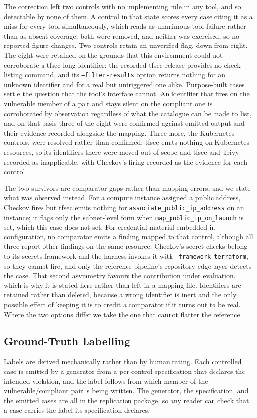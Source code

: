 \documentclass[smallextended]{svjour3}
\begin{document}
The correction left two controls with no implementing rule in any tool, and so
detectable by none of them. A control in that state scores every case citing it
as a miss for every tool simultaneously, which reads as unanimous tool failure
rather than as absent coverage; both were removed, and neither was exercised, so
no reported figure changes. Two controls retain an unverified flag, down from
eight. The eight were retained on the grounds that this environment could not
corroborate a tfsec long identifier: the recorded tfsec release provides no
check-listing command,
and its \texttt{--filter-results} option returns nothing for an unknown identifier
and for a real but untriggered one alike. Purpose-built cases settle the question
that the tool's interface cannot. An identifier that fires on the vulnerable member
of a pair and stays silent on the compliant one is corroborated by observation
regardless of what the catalogue can be made to list, and on that basis three of
the eight were confirmed against emitted output and their evidence recorded
alongside the mapping. Three more, the Kubernetes controls, were resolved rather
than confirmed: tfsec emits nothing on Kubernetes resources, so its identifiers
there were moved out of scope and tfsec and Trivy recorded as inapplicable, with
Checkov's firing recorded as the evidence for each control.

The two survivors are comparator gaps rather than mapping errors, and we state what
was observed instead. For a compute instance assigned a public address, Checkov
fires but tfsec emits nothing for \texttt{associate\_public\_ip\_address} on an
instance; it flags only the subnet-level form when
\texttt{map\_public\_ip\_on\_launch} is set, which this case does not set. For
credential material embedded in configuration, no comparator emits a finding
mapped to that control, although all three report other findings on the same
resource: Checkov's
secret checks belong to its secrets framework and the harness invokes it with
\texttt{--framework terraform}, so they cannot fire, and only the reference
pipeline's repository-edge layer detects the case. That second asymmetry favours
the contribution under evaluation, which is why it is stated here rather than left
in a mapping file. Identifiers are retained rather than deleted, because a wrong
identifier is inert and the only possible effect of keeping it is to credit a
comparator if it turns out to be real. Where the two options differ we take the one
that cannot flatter the reference.

\subsection{Ground-Truth Labelling}
\label{sec:labelling}
Labels are derived mechanically rather than by human rating. Each controlled case
is emitted by a generator from a per-control specification that declares the
intended violation, and the label follows from which member of the
vulnerable/compliant pair is being written. The generator, the specification, and
the emitted cases are all in the replication package, so any reader can check
that a case carries the label its specification declares.
\end{document}
